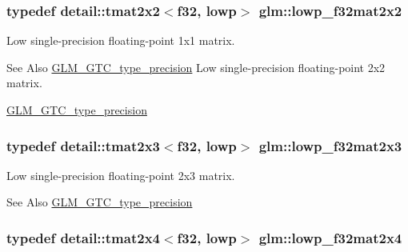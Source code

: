 \hypertarget{group__gtc__type__precision_gae5beaa9212ba199167c7c7088a70b2bd}{
\subsubsection[{lowp\-\_\-f32mat2x2}]{\setlength{\rightskip}{0pt plus 5cm}typedef detail\-::tmat2x2$<$f32, lowp$>$ {\bf glm\-::lowp\-\_\-f32mat2x2}}}\label{group__gtc__type__precision_gae5beaa9212ba199167c7c7088a70b2bd}
Low single-\/precision floating-\/point 1x1 matrix. \begin{DoxySeeAlso}{See Also}
\hyperlink{group__gtc__type__precision}{G\-L\-M\-\_\-\-G\-T\-C\-\_\-type\-\_\-precision} Low single-\/precision floating-\/point 2x2 matrix. 

\hyperlink{group__gtc__type__precision}{G\-L\-M\-\_\-\-G\-T\-C\-\_\-type\-\_\-precision} 
\end{DoxySeeAlso}
\hypertarget{group__gtc__type__precision_ga7e45acb54ae2e4f5113a05b08eea5812}{
\subsubsection[{lowp\-\_\-f32mat2x3}]{\setlength{\rightskip}{0pt plus 5cm}typedef detail\-::tmat2x3$<$f32, lowp$>$ {\bf glm\-::lowp\-\_\-f32mat2x3}}}\label{group__gtc__type__precision_ga7e45acb54ae2e4f5113a05b08eea5812}
Low single-\/precision floating-\/point 2x3 matrix. \begin{DoxySeeAlso}{See Also}
\hyperlink{group__gtc__type__precision}{G\-L\-M\-\_\-\-G\-T\-C\-\_\-type\-\_\-precision} 
\end{DoxySeeAlso}
\hypertarget{group__gtc__type__precision_gae0da8e4239df703d44875b49a900c893}{
\subsubsection[{lowp\-\_\-f32mat2x4}]{\setlength{\rightskip}{0pt plus 5cm}typedef detail\-::tmat2x4$<$f32, lowp$>$ {\bf glm\-::lowp\-\_\-f32mat2x4}}}\label{group__gtc__type__precision_gae0da8e4239df703d44875b49a900c893}

